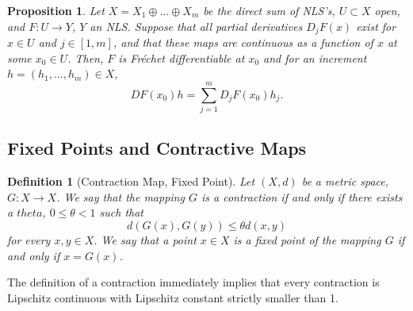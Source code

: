 \documentclass[letterpaper,twoside,12pt]{article}
\theoremstyle{mystyle}
\newtheorem{definition}{Definition}[section]
\newtheorem{prop}{Proposition}[section]
\begin{document}
  \begin{tcolorbox}[colback=red!5!white,colframe=red!75!black]
    \begin{prop}
      Let $X = X_1 \oplus \dots \oplus X_m$ be the direct sum of NLS's, $U\subset X$ open, and $F : U \to Y$, $Y$ an NLS. Suppose that all partial derivatives $D_jF(x)$ exist for $x \in U$ and $j \in [1,m]$, and that these maps are continuous as a function of $x$ at some $x_0 \in U$. Then, $F$ is Fr\'echet differentiable at $x_0$ and for an increment $h = (h_1, \dots, h_m) \in X$, 
      \[DF(x_0)h = \sum_{j = 1}^{m}D_jF(x_0)h_j.\]
    \end{prop}
  \end{tcolorbox}








\subsection{Fixed Points and Contractive Maps}

  \begin{definition}[Contraction Map, Fixed Point]
    Let $(X,d)$ be a metric space, $G:X\to X$. We say that the mapping $G$ is a contraction if and only if there exists a \(theta\), \(0 \leq \theta < 1\) such that 
    \[d\left( G(x), G(y) \right) \leq \theta d(x, y)\]
    for every $x, y \in X$. We say that a point $x \in X$ is a fixed point of the mapping $G$ if and only if $x = G(x)$. 
  \end{definition}
  The definition of a contraction immediately implies that every contraction is Lipschitz continuous with Lipschitz constant strictly smaller than 1. 
\end{document}

